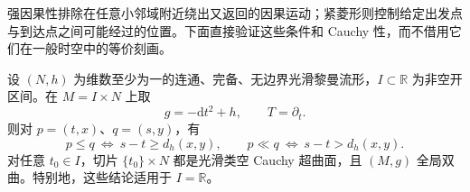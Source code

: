 强因果性排除在任意小邻域附近绕出又返回的因果运动；紧菱形则控制给定出发点与到达点之间可能经过的位置。下面直接验证这些条件和 Cauchy 性，而不借用它们在一般时空中的等价刻画。

\begin{theorem}\label{g3:thm:A-static-global-hyperbolicity}
	设 \((N,h)\) 为维数至少为一的连通、完备、无边界光滑黎曼流形，\(I\subset\mathbb R\) 为非空开区间。在 \(M=I\times N\) 上取
	\begin{equation}\label{g3:eq:A-static-product}
		g=-\mathrm dt^2+h,
		\qquad T=\partial_t.
	\end{equation}
	则对 \(p=(t,x)\)、\(q=(s,y)\)，有
	\begin{equation}\label{g3:eq:A-static-causal-relations}
		p\le q\ \Longleftrightarrow\ s-t\ge d_h(x,y),
		\qquad p\ll q\ \Longleftrightarrow\ s-t>d_h(x,y).
	\end{equation}
	对任意 \(t_0\in I\)，切片 \(\{t_0\}\times N\) 都是光滑类空 Cauchy 超曲面，且 \((M,g)\) 全局双曲。特别地，这些结论适用于 \(I=\mathbb R\)。
\end{theorem}
